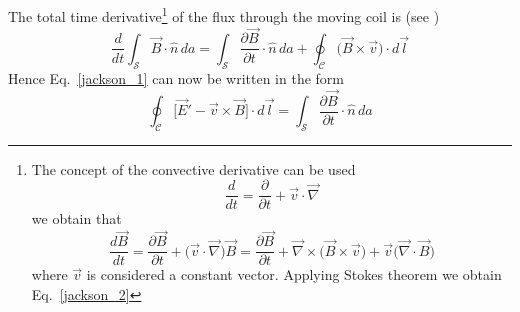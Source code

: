\documentclass[12pt,a4paper]{scrartcl}
\begin{document}
\begin{onehalfspace}
The total time derivative\footnote{
	The concept of the convective derivative can be used \begin{equation*}
		\frac{d}{dt} = \frac{\partial}{\partial t} + \vec{v}\cdot\vec{\nabla}
	\end{equation*}
	we obtain that
	\begin{equation*}
		\frac{d\vec{B}}{dt} = \frac{\partial\vec{B}}{\partial t} + 
		\Big(\vec{v}\cdot\vec{\nabla}\Big)\vec{B} = \frac{\partial 
			\vec{B}}{\partial 
			t}+\vec{\nabla}\times\Big(\vec{B}\times\vec{v}\Big)+\vec{v}\Big(\vec{\nabla}\cdot\vec{B}\Big)
	\end{equation*}
	where $\vec{v}$ is considered a constant vector. Applying Stokes theorem we 
	obtain Eq.~\ref{jackson_2}
} of the flux through the moving coil is (see \cite{p14})
\begin{equation}\label{jackson_2}
	\frac{d}{dt}\int_\mathcal{S}\vec{B}\cdot\hat{n}\,da = 
	\int_\mathcal{S}\frac{\partial\vec{B}}{\partial t}\cdot\hat{n}\,da + 
	\oint_\mathcal{C}\Big(\vec{B}\times\vec{v}\Big)\cdot d\vec{l}
\end{equation}
Hence Eq.~\ref{jackson_1} can now be written in the form
\begin{equation}\label{jackson_3}
	\oint_\mathcal{C}\Big[\vec{E}'-\vec{v}\times\vec{B}\Big]\cdot d\vec{l} = 
	\int_\mathcal{S}\frac{\partial\vec{B}}{\partial t}\cdot\hat{n}\,da
\end{equation}


\end{onehalfspace}
\end{document}
